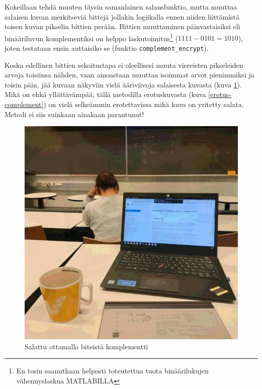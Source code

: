 \documentclass[a4paper,11pt]{article}
\begin{document}
Kokeillaan tehdä muuten täysin samanlainen salausfunktio, mutta muuttaa salaisen kuvan merkitseviä bittejä jollakin logiikalla ennen niiden liittämistä toisen kuvan pikselin bittien perään. Bittien muuttaminen päinvastaisiksi eli binääriluvun komplementiksi on helppo laskutoimitus\footnote{En tosin saanutkaan helposti toteutettua tuota binäärilukujen vähennyslaskua MATLABILLA} ($1111-0101=1010$), joten testataan ensin auttaisiko se (funktio \texttt{complement\_encrypt}). 

Koska edellinen bittien sekoitustapa ei oleellisesi muuta viereisten pikseleiden arvoja toisiinsa nähden, vaan ainoastaan muuttaa isoimmat arvot pienimmiksi ja toisin päin, jää kuvaan näkyviin vielä ääriviivoja salaisesta kuvasta (kuva \ref{salattu-complement}). Mikä on ehkä yllättävämpää, tällä metodilla erotuskuvasta (kuva \ref{erotus-complement}) on vielä selkeämmin erotettavissa mikä kuva on yritetty salata. Metodi ei siis suinkaan ainakaan parantunut!

\begin{figure}
    \centering
    \includegraphics[width= 120mm]{kuvat/salattu2.jpg}
    \caption{Salattu ottamalla biteistä komplementti}
    \label{salattu-complement}
\end{figure}
\end{document}
